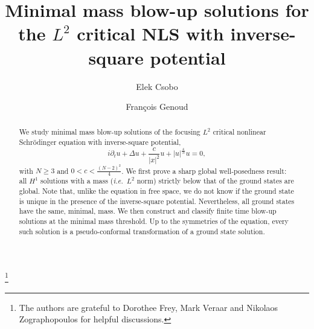 \documentclass[reqno]{amsart}
\let\ge= \geqslant
\theoremstyle{plain}
\theoremstyle{definition}
\numberwithin{equation}{section}
\begin{document}
\title[Blow-up solutions of NLS with inverse-square potential]
{Minimal mass blow-up solutions
for the $L^2$ critical NLS with inverse-square potential}

\author[E. Csobo]{Elek Csobo}
\address{Delft Institute of Applied Mathematics \\
Delft University of Technology\\
Mekelweg~4\\
2628~CD Delft, The Netherlands}

\author[F. Genoud]{Fran\c cois Genoud}
\address{Delft Institute of Applied Mathematics \\
Delft University of Technology\\
Mekelweg~4\\
2628~CD Delft, The Netherlands}



\thanks{The authors are grateful to Dorothee Frey, Mark Veraar and Nikolaos Zographopoulos  
for helpful discussions.}


\begin{abstract}
We study minimal mass blow-up solutions of the focusing $L^2$
critical nonlinear Schr\"odinger equation with inverse-square potential,
\[
i\partial_t u + \Delta u + \frac{c}{|x|^2}u+|u|^{\frac{4}{N}}u = 0,
\]
with $N\ge 3$ and $0<c<\frac{(N-2)^2}{4}$. We first prove a sharp global well-posedness 
result: all $H^1$ solutions with a mass ({\em i.e.}~$L^2$ norm) strictly below that of the ground states
are global. Note that, unlike the equation in free space, we do not know if the ground state
is unique in the presence of the inverse-square potential. Nevertheless, all ground states
have the same, minimal, mass. We then construct and classify finite time blow-up solutions at the 
minimal mass threshold. Up to the symmetries of the equation, every such solution is a 
pseudo-conformal transformation of a ground state solution.
\end{abstract}
\end{document}
